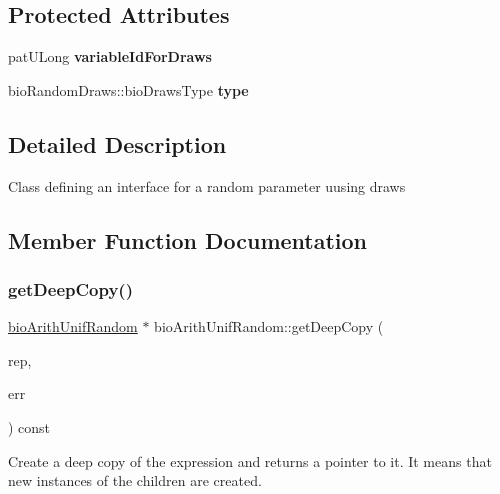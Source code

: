 \subsection*{Protected Attributes}
\begin{DoxyCompactItemize}
\item 
\mbox{\label{classbio_arith_unif_random_a0d448466887276155422c56cfa9d12ae}} 
pat\+U\+Long {\bfseries variable\+Id\+For\+Draws}
\item 
\mbox{\label{classbio_arith_unif_random_af342ff300e284db90f92bfd8c31b5609}} 
bio\+Random\+Draws\+::bio\+Draws\+Type {\bfseries type}
\end{DoxyCompactItemize}


\subsection{Detailed Description}
Class defining an interface for a random parameter uusing draws 

\subsection{Member Function Documentation}
\mbox{\label{classbio_arith_unif_random_ad7aaa2ab5f06eb38945d39359bb55df5}} 
\subsubsection{\texorpdfstring{get\+Deep\+Copy()}{getDeepCopy()}}
{\footnotesize\ttfamily \hyperlink{classbio_arith_unif_random}{bio\+Arith\+Unif\+Random} $\ast$ bio\+Arith\+Unif\+Random\+::get\+Deep\+Copy (\begin{DoxyParamCaption}\item[{\hyperlink{classbio_expression_repository}{bio\+Expression\+Repository} $\ast$}]{rep,  }\item[{pat\+Error $\ast$\&}]{err }\end{DoxyParamCaption}) const\hspace{0.3cm}{\ttfamily [virtual]}}

Create a deep copy of the expression and returns a pointer to it. It means that new instances of the children are created. 

